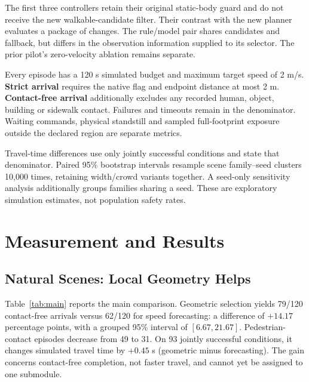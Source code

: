 \documentclass[a4paper,12pt]{article}
\begin{document}
The first three controllers retain their original static-body guard and do not receive the new walkable-candidate filter. Their contrast with the new planner evaluates a package of changes. The rule/model pair shares candidates and fallback, but differs in the observation information supplied to its selector. The prior pilot's zero-velocity ablation remains separate.

Every episode has a 120 s simulated budget and maximum target speed of 2 m/s. \textbf{Strict arrival} requires the native flag and endpoint distance at most 2 m. \textbf{Contact-free arrival} additionally excludes any recorded human, object, building or sidewalk contact. Failures and timeouts remain in the denominator. Waiting commands, physical standstill and sampled full-footprint exposure outside the declared region are separate metrics.

Travel-time differences use only jointly successful conditions and state that denominator. Paired 95\% bootstrap intervals resample scene family--seed clusters 10,000 times, retaining width/crowd variants together. A seed-only sensitivity analysis additionally groups families sharing a seed. These are exploratory simulation estimates, not population safety rates.

\FloatBarrier
\section{Measurement and Results}
\subsection{Natural Scenes: Local Geometry Helps}
Table~\ref{tab:main} reports the main comparison. Geometric selection yields 79/120 contact-free arrivals versus 62/120 for speed forecasting: a difference of $+14.17$ percentage points, with a grouped 95\% interval of $[6.67,21.67]$. Pedestrian-contact episodes decrease from 49 to 31. On 93 jointly successful conditions, it changes simulated travel time by $+0.45$ s (geometric minus forecasting). The gain concerns contact-free completion, not faster travel, and cannot yet be assigned to one submodule.
\end{document}
